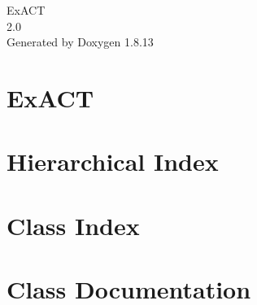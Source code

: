 \documentclass[twoside]{book}
\newcommand{\+}{\discretionary{\mbox{\scriptsize$\hookleftarrow$}}{}{}}
\newcommand{\clearemptydoublepage}{%
  \newpage{\pagestyle{empty}\cleardoublepage}%
}
\begin{document}
\hypersetup{pageanchor=false,
             bookmarksnumbered=true,
             pdfencoding=unicode
            }
\begin{titlepage}
\vspace*{7cm}
\begin{center}%
{\Large Ex\+A\+CT \\[1ex]\large 2.\+0 }\\
\vspace*{1cm}
{\large Generated by Doxygen 1.8.13}\\
\end{center}
\end{titlepage}
\clearemptydoublepage
{}
\tableofcontents
\clearemptydoublepage
{}
\hypersetup{pageanchor=true}

\chapter{Ex\+A\+CT}
\label{index}\hypertarget{index}{}
\chapter{Hierarchical Index}

\chapter{Class Index}

\chapter{Class Documentation}











\backmatter
\newpage
{}
\clearemptydoublepage
{}
\printindex
\end{document}
